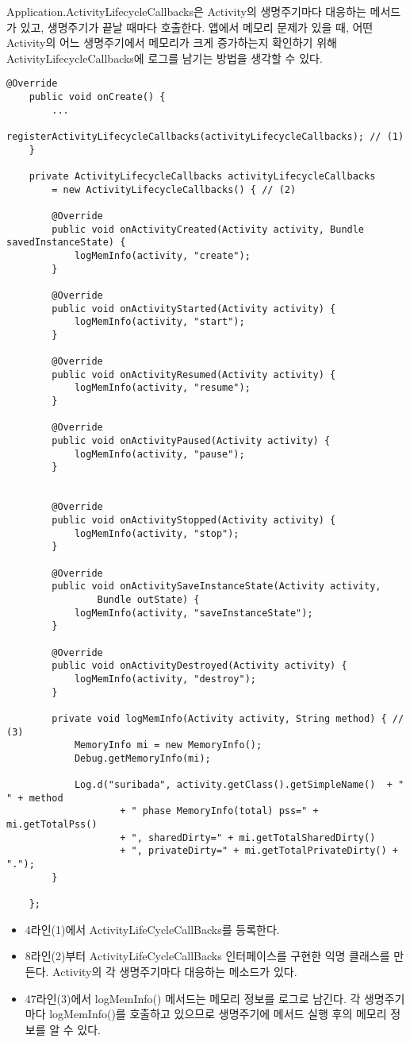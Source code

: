 Application.ActivityLifecycleCallbacks은 Activity의 생명주기마다 대응하는 메서드가 있고, 생명주기가 끝날 때마다 호출한다.
앱에서 메모리 문제가 있을 때, 어떤 Activity의 어느 생명주기에서 메모리가 크게 증가하는지 확인하기 위해 ActivityLifecycleCallbacks에 로그를 남기는 방법을 생각할 수 있다.
\begin{lstlisting}[frame=single] 
	@Override
	public void onCreate() {
		...
		registerActivityLifecycleCallbacks(activityLifecycleCallbacks); // (1)
	}
	
	private ActivityLifecycleCallbacks activityLifecycleCallbacks 
		= new ActivityLifecycleCallbacks() { // (2)
		
		@Override
		public void onActivityCreated(Activity activity, Bundle savedInstanceState) {
			logMemInfo(activity, "create");
		}
		
		@Override
		public void onActivityStarted(Activity activity) {
			logMemInfo(activity, "start");
		}
		
		@Override
		public void onActivityResumed(Activity activity) {
			logMemInfo(activity, "resume");
		}
		
		@Override
		public void onActivityPaused(Activity activity) {
			logMemInfo(activity, "pause");
		}

		
		@Override
		public void onActivityStopped(Activity activity) {
			logMemInfo(activity, "stop");
		}
		
		@Override
		public void onActivitySaveInstanceState(Activity activity, 
				Bundle outState) {
			logMemInfo(activity, "saveInstanceState");
		}
		
		@Override
		public void onActivityDestroyed(Activity activity) {
			logMemInfo(activity, "destroy");
		}
		
		private void logMemInfo(Activity activity, String method) { // (3)
			MemoryInfo mi = new MemoryInfo(); 
			Debug.getMemoryInfo(mi);
			
			Log.d("suribada", activity.getClass().getSimpleName()  + " " + method 
					+ " phase MemoryInfo(total) pss=" + mi.getTotalPss() 
					+ ", sharedDirty=" + mi.getTotalSharedDirty() 
					+ ", privateDirty=" + mi.getTotalPrivateDirty() + "."); 
		}
	
	};
\end{lstlisting}
\begin{itemize}
\item 4라인(1)에서 ActivityLifeCycleCallBacks를 등록한다.
\item 8라인(2)부터 ActivityLifeCycleCallBacks 인터페이스를 구현한 익명 클래스를 만든다. Activity의 각 생명주기마다 대응하는 메소드가 있다.
\item 47라인(3)에서 logMemInfo() 메서드는 메모리 정보를 로그로 남긴다. 각 생명주기마다 logMemInfo()를 호출하고 있으므로 생명주기에 메서드 실행 후의 메모리 정보를 알 수 있다.
\end{itemize}

